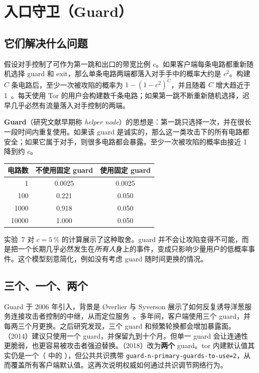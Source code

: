 \section{入口守卫（Guard）}\label{sec:guard}

\subsection{它们解决什么问题}

假设对手控制了可作为第一跳和出口的带宽比例 $c$。如果客户端每条电路都重新随机选择 guard 和 exit，那么单条电路两端都落入对手手中的概率大约是 $c^2$。构建 $C$ 条电路后，至少一次被攻陷的概率为
$1 - (1 - c^2)^C$，并且随着 $C$ 增大趋近于 1~。每天使用 Tor 的用户会构建数千条电路；如果第一跳不断重新随机选择，迟早几乎必然有流量落入对手控制的两端。

\textbf{Guard}（研究文献早期称 \emph{helper node}）的思想是：第一跳只选择一次，并在很长一段时间内重复使用。如果该 guard 是诚实的，那么这一类攻击下的所有电路都安全；如果它属于对手，则很多电路都会暴露。至少一次被攻陷的概率由接近 1 降到约 $c$。

\begin{center}
\begin{tabular}{rcc}
\toprule
电路数 & 不使用固定 guard & 使用固定 guard \\
\midrule
1 & 0.0025 & 0.0025 \\
100 & 0.221 & 0.050 \\
\num{1000} & 0.918 & 0.050 \\
\num{10000} & 1.000 & 0.050 \\
\bottomrule
\end{tabular}
\end{center}

\noindent 实验~7 对 $c=5\,\%$ 的计算展示了这种取舍。guard 并不会让攻陷变得不可能，而是把一个长期几乎必然发生在\emph{所有人}身上的事件，变成只影响少量用户的低概率事件。这个模型刻意简化，例如没有考虑 guard 随时间更换的情况。

\subsection{三个、一个、两个}

Guard 于 2006 年引入，背景是 Øverlier 与 Syverson 展示了如何反复诱导洋葱服务连接攻击者控制的中继，从而定位服务~\cite{overlier2006locating}。多年间，客户端使用三个 guard，并每两三个月更换。之后研究发现，三个 guard 和频繁轮换都会增加暴露面。（2014）建议只使用一个 guard，并保留九到十个月。但单一 guard 会让连通性更脆弱，也更容易被攻击者强迫替换。（2018）改为\textbf{两个} guard。tor 内建默认值其实仍是一个（ 中的 ），但公共共识携带 \texttt{guard-n-primary-guards-to-use=2}，从而覆盖所有客户端默认值。这再次说明权威如何通过共识调节网络行为。

